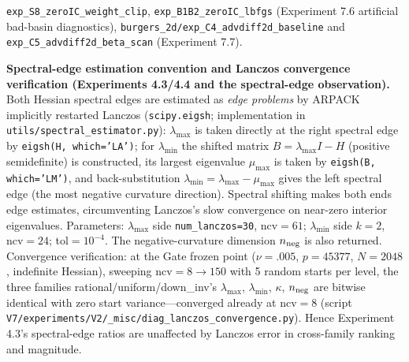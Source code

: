\documentclass[11pt]{article}
\numberwithin{equation}{section}
\begin{document}
\texttt{exp\_\hspace{0pt}S8\_\hspace{0pt}zeroIC\_\hspace{0pt}weight\_\hspace{0pt}clip}, \texttt{exp\_\hspace{0pt}B1B2\_\hspace{0pt}zeroIC\_\hspace{0pt}lbfgs} (Experiment 7.6 artificial bad-basin diagnostics), \texttt{burgers\_\hspace{0pt}2d/\hspace{0pt}exp\_\hspace{0pt}C4\_\hspace{0pt}advdiff2d\_\hspace{0pt}baseline} and \texttt{exp\_\hspace{0pt}C5\_\hspace{0pt}advdiff2d\_\hspace{0pt}beta\_\hspace{0pt}scan} (Experiment 7.7).
\par\smallskip\noindent\textbf{Spectral-edge estimation convention and Lanczos convergence verification (Experiments 4.3/4.4 and the spectral-edge observation).} Both Hessian spectral edges are estimated as \emph{edge problems} by ARPACK implicitly restarted Lanczos (\texttt{scipy.eigsh}; implementation in \texttt{utils/\hspace{0pt}spectral\_\hspace{0pt}estimator.py}): $\lambda_{\max}$ is taken directly at the right spectral edge by \texttt{eigsh(H, which='LA')}; for $\lambda_{\min}$ the shifted matrix $B=\lambda_{\max}I-H$ (positive semidefinite) is constructed, its largest eigenvalue $\mu_{\max}$ is taken by \texttt{eigsh(B, which='LM')}, and back-substitution $\lambda_{\min}=\lambda_{\max}-\mu_{\max}$ gives the left spectral edge (the most negative curvature direction). Spectral shifting makes both ends edge estimates, circumventing Lanczos's slow convergence on near-zero interior eigenvalues. Parameters: $\lambda_{\max}$ side \texttt{num\_\hspace{0pt}lanczos=30}, ncv$=61$; $\lambda_{\min}$ side $k=2$, ncv$=24$; tol$=10^{-4}$. The negative-curvature dimension $n_{\rm neg}$ is also returned. Convergence verification: at the Gate frozen point ($\nu=.005$, $p=45377$, $N=2048$, indefinite Hessian), sweeping ncv$=8\to150$ with 5 random starts per level, the three families rational/uniform/down\_inv's $\lambda_{\max}$, $\lambda_{\min}$, $\kappa$, $n_{\rm neg}$ are bitwise identical with zero start variance---converged already at ncv$=8$ (script \texttt{V7/\hspace{0pt}experiments/\hspace{0pt}V2/\hspace{0pt}\_\hspace{0pt}misc/\hspace{0pt}diag\_\hspace{0pt}lanczos\_\hspace{0pt}convergence.py}). Hence Experiment 4.3's spectral-edge ratios are unaffected by Lanczos error in cross-family ranking and magnitude.
\end{document}
